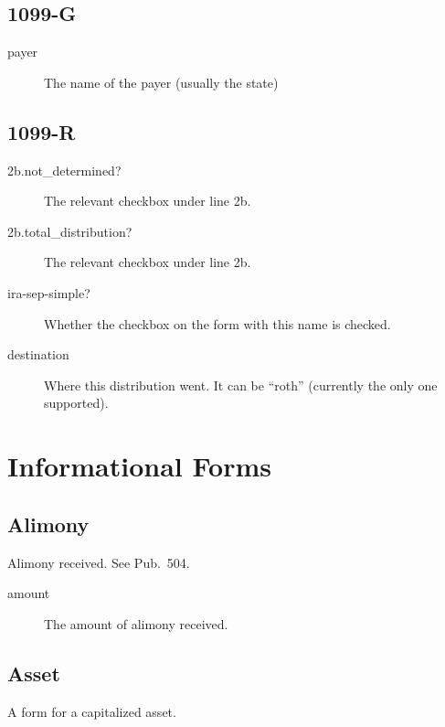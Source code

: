 \documentclass[12pt]{article}
\begin{document}
\subsection{1099-G}

\begin{description}
\item[payer] The name of the payer (usually the state)
\end{description}


\subsection{1099-R}

\begin{description}
\item[2b.not\_determined?] The relevant checkbox under line 2b.
\item[2b.total\_distribution?] The relevant checkbox under line 2b.
\item[ira-sep-simple?] Whether the checkbox on the form with this name is
checked.
\item[destination] Where this distribution went. It can be ``roth''
(currently the only one supported).
\end{description}


\section{Informational Forms}



\subsection{Alimony}

Alimony received. See Pub.\ 504.

\begin{description}
\item[amount] The amount of alimony received.
\end{description}


\subsection{Asset}

A form for a capitalized asset.
\end{document}
